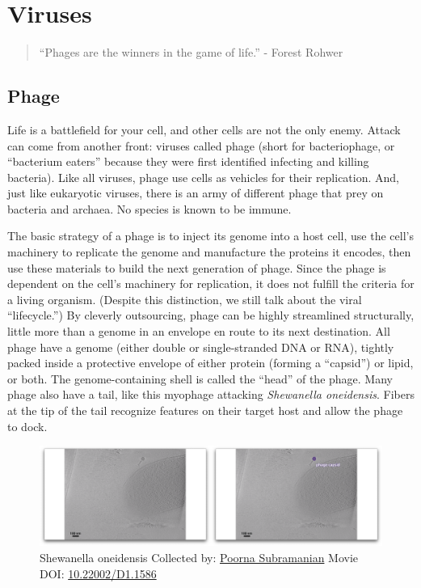 \documentclass[]{tufte-book}
\begin{document}
\chapter{Viruses}\label{viruses}

\begin{quote}
``Phages are the winners in the game of life.'' - Forest Rohwer
\citep{rohwer2014}
\end{quote}

\section{Phage}\label{phage}

Life is a battlefield for your cell, and other cells are not the only
enemy. Attack can come from another front: viruses called phage (short
for bacteriophage, or ``bacterium eaters'' because they were first
identified infecting and killing bacteria). Like all viruses, phage use
cells as vehicles for their replication. And, just like eukaryotic
viruses, there is an army of different phage that prey on bacteria and
archaea. No species is known to be immune.

The basic strategy of a phage is to inject its genome into a host cell,
use the cell's machinery to replicate the genome and manufacture the
proteins it encodes, then use these materials to build the next
generation of phage. Since the phage is dependent on the cell's
machinery for replication, it does not fulfill the criteria for a living
organism. (Despite this distinction, we still talk about the viral
``lifecycle.'') By cleverly outsourcing, phage can be highly streamlined
structurally, little more than a genome in an envelope en route to its
next destination. All phage have a genome (either double or
single-stranded DNA or RNA), tightly packed inside a protective envelope
of either protein (forming a ``capsid'') or lipid, or both. The
genome-containing shell is called the ``head'' of the phage. Many phage
also have a tail, like this myophage attacking \emph{Shewanella
oneidensis}. Fibers at the tip of the tail recognize features on their
target host and allow the phage to dock.





\begin{figure}
\includegraphics{movie_stills/10_1} \caption[Shewanella oneidensis Collected by:
\protect\hyperlink{poorna_subramanian}{Poorna Subramanian} Movie DOI:
\href{https://doi.org/10.22002/D1.1586}{10.22002/D1.1586}]{Shewanella oneidensis Collected by:
\protect\hyperlink{poorna_subramanian}{Poorna Subramanian} Movie DOI:
\href{https://doi.org/10.22002/D1.1586}{10.22002/D1.1586}}\label{fig:10-1}
\end{figure}
\end{document}
